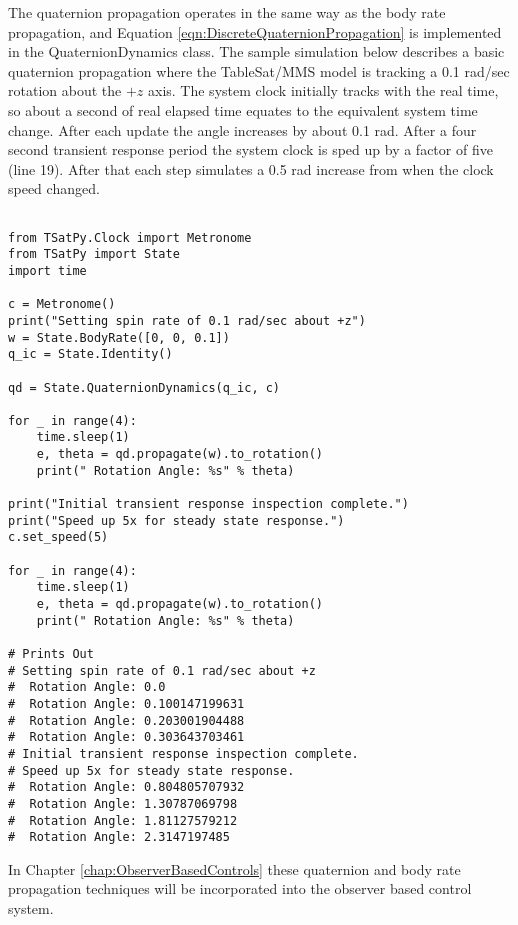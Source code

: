 The quaternion propagation operates in the same way as the body rate propagation, and Equation \ref{eqn:DiscreteQuaternionPropagation} is implemented in the QuaternionDynamics class.  The sample simulation below describes a basic quaternion propagation where the TableSat/MMS model is tracking a 0.1 rad/sec rotation about the $+z$ axis.  The system clock initially tracks with the real time, so about a second of real elapsed time equates to the equivalent system time change.  After each update the angle increases by about 0.1 rad.  After a four second transient response period the system clock is sped up by a factor of five (line 19).  After that each step simulates a 0.5 rad increase from when the clock speed changed.

\begin{singlespace}
  \begin{verbatim}

from TSatPy.Clock import Metronome
from TSatPy import State
import time

c = Metronome()
print("Setting spin rate of 0.1 rad/sec about +z")
w = State.BodyRate([0, 0, 0.1])
q_ic = State.Identity()

qd = State.QuaternionDynamics(q_ic, c)

for _ in range(4):
    time.sleep(1)
    e, theta = qd.propagate(w).to_rotation()
    print(" Rotation Angle: %s" % theta)

print("Initial transient response inspection complete.")
print("Speed up 5x for steady state response.")
c.set_speed(5)

for _ in range(4):
    time.sleep(1)
    e, theta = qd.propagate(w).to_rotation()
    print(" Rotation Angle: %s" % theta)

# Prints Out
# Setting spin rate of 0.1 rad/sec about +z
#  Rotation Angle: 0.0
#  Rotation Angle: 0.100147199631
#  Rotation Angle: 0.203001904488
#  Rotation Angle: 0.303643703461
# Initial transient response inspection complete.
# Speed up 5x for steady state response.
#  Rotation Angle: 0.804805707932
#  Rotation Angle: 1.30787069798
#  Rotation Angle: 1.81127579212
#  Rotation Angle: 2.3147197485
  \end{verbatim}
  \nocite{minted}
\end{singlespace}


In Chapter \ref{chap:ObserverBasedControls} these quaternion and body rate propagation techniques will be incorporated into the observer based control system.

